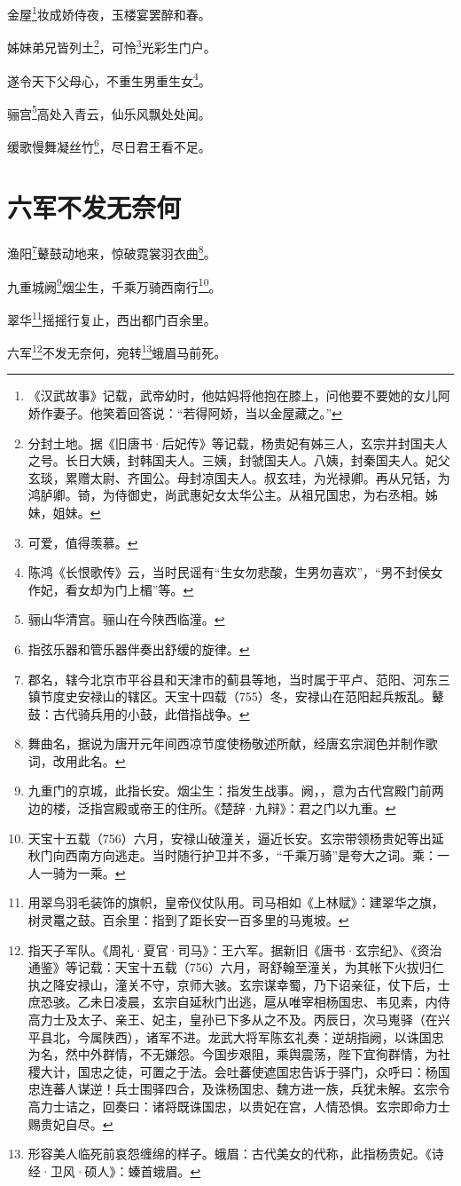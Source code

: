 \documentclass[UTF8]{ctexart}
\begin{document}
金屋\footnote{《汉武故事》记载，武帝幼时，他姑妈将他抱在膝上，问他要不要她的女儿阿娇作妻子。他笑着回答说：“若得阿娇，当以金屋藏之。”}妆成娇侍夜，玉楼宴罢醉和春。

姊妹弟兄皆列土\footnote{分封土地。据《旧唐书·后妃传》等记载，杨贵妃有姊三人，玄宗并封国夫人之号。长日大姨，封韩国夫人。三姨，封虢国夫人。八姨，封秦国夫人。妃父玄琰，累赠太尉、齐国公。母封凉国夫人。叔玄珪，为光禄卿。再从兄铦，为鸿胪卿。锜，为侍御史，尚武惠妃女太华公主。从祖兄国忠，为右丞相。姊妹，姐妹。}，可怜\footnote{可爱，值得羡慕。}光彩生门户。

遂令天下父母心，不重生男重生女\footnote{陈鸿《长恨歌传》云，当时民谣有“生女勿悲酸，生男勿喜欢”，“男不封侯女作妃，看女却为门上楣”等。}。

骊宫\footnote{骊山华清宫。骊山在今陕西临潼。}高处入青云，仙乐风飘处处闻。

缓歌慢舞凝丝竹\footnote{指弦乐器和管乐器伴奏出舒缓的旋律。}，尽日君王看不足。

\section{六军不发无奈何}

渔阳\footnote{郡名，辖今北京市平谷县和天津市的蓟县等地，当时属于平卢、范阳、河东三镇节度史安禄山的辖区。天宝十四载（755）冬，安禄山在范阳起兵叛乱。鼙鼓：古代骑兵用的小鼓，此借指战争。}鼙鼓动地来，惊破霓裳羽衣曲\footnote{舞曲名，据说为唐开元年间西凉节度使杨敬述所献，经唐玄宗润色并制作歌词，改用此名。}。

九重城阙\footnote{九重门的京城，此指长安。烟尘生：指发生战事。阙，，意为古代宫殿门前两边的楼，泛指宫殿或帝王的住所。《楚辞·九辩》：君之门以九重。}烟尘生，千乘万骑西南行\footnote{天宝十五载（756）六月，安禄山破潼关，逼近长安。玄宗带领杨贵妃等出延秋门向西南方向逃走。当时随行护卫并不多，“千乘万骑”是夸大之词。乘：一人一骑为一乘。}。

翠华\footnote{用翠鸟羽毛装饰的旗帜，皇帝仪仗队用。司马相如《上林赋》：建翠华之旗，树灵鼍之鼓。百余里：指到了距长安一百多里的马嵬坡。}摇摇行复止，西出都门百余里。

六军\footnote{指天子军队。《周礼·夏官·司马》：王六军。据新旧《唐书·玄宗纪》、《资治通鉴》等记载：天宝十五载（756）六月，哥舒翰至潼关，为其帐下火拔归仁执之降安禄山，潼关不守，京师大骇。玄宗谋幸蜀，乃下诏亲征，仗下后，士庶恐骇。乙未日凌晨，玄宗自延秋门出逃，扈从唯宰相杨国忠、韦见素，内侍高力士及太子、亲王、妃主，皇孙已下多从之不及。丙辰日，次马嵬驿（在兴平县北，今属陕西），诸军不进。龙武大将军陈玄礼奏：逆胡指阙，以诛国忠为名，然中外群情，不无嫌怨。今国步艰阻，乘舆震荡，陛下宜徇群情，为社稷大计，国忠之徒，可置之于法。会吐蕃使遮国忠告诉于驿门，众呼曰：杨国忠连蕃人谋逆！兵士围驿四合，及诛杨国忠、魏方进一族，兵犹未解。玄宗令高力士诘之，回奏曰：诸将既诛国忠，以贵妃在宫，人情恐惧。玄宗即命力士赐贵妃自尽。}不发无奈何，宛转\footnote{形容美人临死前哀怨缠绵的样子。蛾眉：古代美女的代称，此指杨贵妃。《诗经·卫风·硕人》：螓首蛾眉。}蛾眉马前死。
\end{document}
